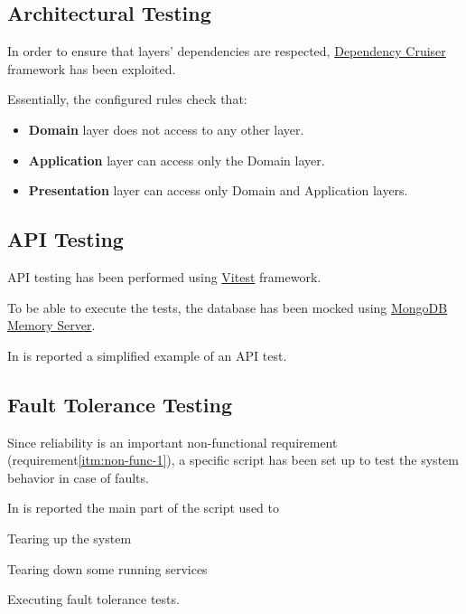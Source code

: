 \documentclass{scrartcl}
\begin{document}
    \subsection{Architectural Testing}\label{subsec:architecture-testing}

    In order to ensure that layers' dependencies are respected, \href{https://github.com/sverweij/dependency-cruiser}{Dependency Cruiser} framework has been exploited.

    Essentially, the configured rules check that:

    \begin{itemize}
        \item \textbf{Domain} layer does not access to any other layer.
        \item \textbf{Application} layer can access only the Domain layer.
        \item \textbf{Presentation} layer can access only Domain and Application layers.
    \end{itemize}

    \subsection{API Testing}\label{subsec:api-testing}

    API testing has been performed using \href{https://vitest.dev/}{Vitest} framework.

    To be able to execute the tests, the database has been mocked using \href{https://github.com/nodkz/mongodb-memory-server}{MongoDB Memory Server}.

    In  is reported a simplified example of an API test.

    


    \subsection{Fault Tolerance Testing}\label{subsec:fault-tolerance-testing}

    Since reliability is an important non-functional requirement (requirement\ref{itm:non-func-1}),
    a specific script has been set up to test the system behavior in case of faults.

    In  is reported the main part of the script used to
    \begin{enumerate*}
        \item Tearing up the system
        \item Tearing down some running services
        \item Executing fault tolerance tests.
    \end{enumerate*}
\end{document}
